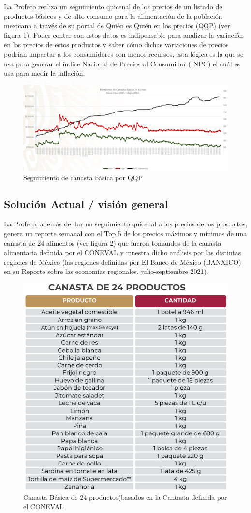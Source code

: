 \documentclass{article}
\begin{document}
La Profeco realiza un seguimiento quicenal de los precios de un listado de productos básicos y de alto consumo para la alimentación de la población mexicana a través de su portal de \href{https://www.profeco.gob.mx/precios/canasta/qqpc.php}{Quién es Quién en los precios (QQP)} (ver figura 1). Poder contar con estos datos es indipensable para analizar la variación en los precios de estos productos y saber cómo dichas variaciones de precios podrían impactar a los consumidores con menos recursos, esta lógica es la que se usa para generar el índice Nacional de Precios al Consumidor (INPC) el cuál es usa para medir la inflación.

\begin{figure}[h]
\centering
\includegraphics[width=0.8\linewidth]{Reports/images/Tendencia.png}
\caption{\label{fig:Canasta}Seguimiento de canasta básica por QQP}
\end{figure}

\subsection{Solución Actual / visión general}
La Profeco, además de dar un seguimiento quicenal a los precios de los productos, genera un reporte semanal con el Top 5 de los precios máximos y mínimos de una canasta de 24 alimentos (ver figura 2) que fueron tomandos de la canasta alimentaria definida por el CONEVAL y muestra dicho análisis por las distintas regiones de México (las regiones definidas por El Banco de México (BANXICO) en su Reporte sobre las economías regionales, julio-septiembre 2021). 

\begin{figure}[h]
\centering
\includegraphics[width=0.7\linewidth]{Reports/images/Canasta.png}
\caption{\label{fig:Architecture}Canasta Básica de 24 productos(basados en la Cantasta definida por el CONEVAL}
\end{figure}
\end{document}
